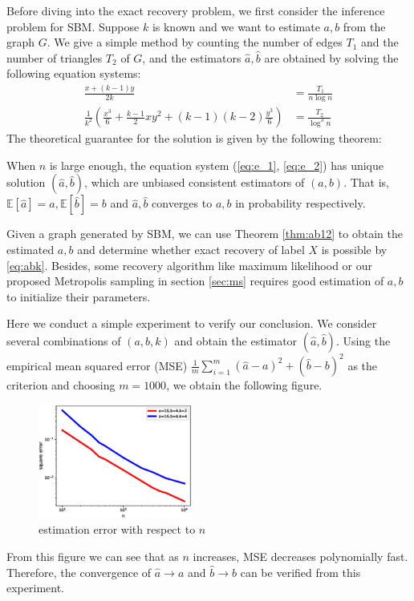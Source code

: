\documentclass[entropy,article,submit,moreauthors,pdftex]{Definitions/mdpi}
\newcommand{\1}{\mathbbm{1}}
\begin{document}
Before diving into the exact recovery problem, we first consider the inference problem for SBM.
Suppose $k$ is known and we want to estimate $a,b$ from the graph $G$.
We give a simple method
by counting the number of edges $T_1$ and the number of triangles $T_2$ of $G$, and the estimators $\hat{a}, \hat{b}$ are
obtained by solving the following equation systems:
\begin{align}
\frac{x+(k-1)y}{2k} & = \frac{T_1}{n\log n} \label{eq:e_1}\\
\frac{1}{k^2}
\left(\frac{x^3}{6} + \frac{k-1}{2}xy^2 + (k-1)(k-2)\frac{y^3}{6}\right) & = \frac{T_2}{\log^3 n} \label{eq:e_2}
\end{align}
The theoretical guarantee for the solution is given by the following theorem:
\begin{Theorem}\label{thm:ab12}
When $n$ is large enough, the equation system (\ref{eq:e_1}, \ref{eq:e_2}) has unique solution $(\hat{a}, \hat{b})$,
which are unbiased consistent estimators
of $(a,b)$. That is,
$\mathbb{E}[\hat{a}] = a, \mathbb{E}[\hat{b}] = b$ and $\hat{a}, \hat{b}$ converges to $a,b$ in probability respectively.
\end{Theorem}
Given a graph generated by SBM, we can use Theorem \ref{thm:ab12} to obtain the estimated $a,b$ and determine whether
exact recovery of label $X$ is possible by \eqref{eq:abk}. Besides, some recovery algorithm like maximum likelihood or our proposed Metropolis sampling in section \ref{sec:ms} requires good estimation of $a,b$
to initialize their parameters.

Here we conduct a simple experiment to verify our conclusion.
We consider several combinations of $(a,b,k)$ and obtain the estimator $(\hat{a}, \hat{b})$. Using
the empirical mean squared error (MSE) $\frac{1}{m} \sum_{i=1}^m (\hat{a}-a)^2 + (\hat{b}-b)^2$ as the criterion
and choosing $m=1000$, we obtain the following figure.
\begin{figure}[!ht]
	\centering
	\includegraphics[width=0.45\textwidth]{estimator-error-2020-11-22.eps}
	\caption{estimation error with respect to $n$}
\end{figure}
From this figure we can see that as $n$ increases, MSE decreases polynomially fast. Therefore, the convergence
of $\hat{a} \to a$ and $\hat{b} \to b$ can be verified from this experiment.
\end{document}

